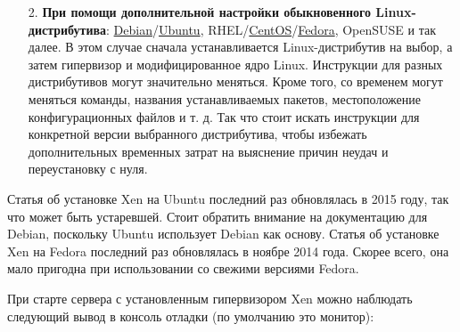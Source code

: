 \documentclass[14pt, a4paper]{article}
\begin{document}
\begin{enumerate}
    \item[2.] \textbf{При помощи дополнительной настройки обыкновенного Linux-дистрибутива}:
    \href{https://wiki.debian.org/Xen}{Debian}/\href{https://help.ubuntu.com/community/Xen}{Ubuntu}, RHEL/\href{https://wiki.centos.org/HowTos/Xen/Xen4QuickStart}{CentOS}/\href{https://wiki.xen.org/wiki/Fedora_Host_Installation}{Fedora}, OpenSUSE и так далее. В этом случае сначала
    устанавливается Linux-дистрибутив на выбор, а затем гипервизор и модифицированное ядро
    Linux. Инструкции для разных дистрибутивов могут значительно меняться. Кроме того, со
    временем могут меняться команды, названия устанавливаемых пакетов, местоположение
    конфигурационных файлов и т. д. Так что стоит искать инструкции для конкретной версии
    выбранного дистрибутива, чтобы избежать дополнительных временных затрат на выяснение
    причин неудач и переустановку с нуля. 
\end{enumerate}


Статья об установке Xen на Ubuntu последний раз обновлялась в 2015 году, так что может быть
устаревшей. Стоит обратить внимание на документацию для Debian, поскольку Ubuntu использует
Debian как основу. Статья об установке Xen на Fedora последний раз обновлялась в ноябре 2014 года.
Скорее всего, она мало пригодна при использовании со свежими версиями Fedora.


При старте сервера с установленным гипервизором Xen можно наблюдать следующий вывод в
консоль отладки (по умолчанию это монитор):
\end{document}
